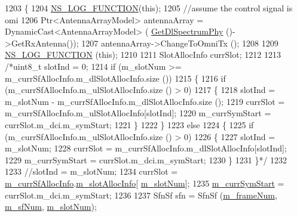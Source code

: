 \begin{DoxyCode}
1203 \{
1204 \hyperlink{log-macros-disabled_8h_a90b90d5bad1f39cb1b64923ea94c0761}{NS\_LOG\_FUNCTION}(\textcolor{keyword}{this});
1205         \textcolor{comment}{//assume the control signal is omi}
1206         Ptr<AntennaArrayModel> antennaArray = DynamicCast<AntennaArrayModel> (
      \hyperlink{classns3_1_1MmWaveEnbPhy_a1fd12ed3e1da54288cf17a1bb9bcdf74}{GetDlSpectrumPhy} ()->GetRxAntenna());
1207         antennaArray->ChangeToOmniTx ();
1208 
1209         \hyperlink{log-macros-disabled_8h_a90b90d5bad1f39cb1b64923ea94c0761}{NS\_LOG\_FUNCTION} (\textcolor{keyword}{this});
1210 
1211         SlotAllocInfo currSlot;
1212 
1213         \textcolor{comment}{/*uint8\_t slotInd = 0;}
1214 \textcolor{comment}{        if (m\_slotNum >= m\_currSfAllocInfo.m\_dlSlotAllocInfo.size ())}
1215 \textcolor{comment}{        \{}
1216 \textcolor{comment}{                if (m\_currSfAllocInfo.m\_ulSlotAllocInfo.size () > 0)}
1217 \textcolor{comment}{                \{}
1218 \textcolor{comment}{                        slotInd = m\_slotNum - m\_currSfAllocInfo.m\_dlSlotAllocInfo.size ();}
1219 \textcolor{comment}{                        currSlot = m\_currSfAllocInfo.m\_ulSlotAllocInfo[slotInd];}
1220 \textcolor{comment}{                        m\_currSymStart = currSlot.m\_dci.m\_symStart;}
1221 \textcolor{comment}{                \}}
1222 \textcolor{comment}{        \}}
1223 \textcolor{comment}{        else}
1224 \textcolor{comment}{        \{}
1225 \textcolor{comment}{                if (m\_currSfAllocInfo.m\_ulSlotAllocInfo.size () > 0)}
1226 \textcolor{comment}{                \{}
1227 \textcolor{comment}{                        slotInd = m\_slotNum;}
1228 \textcolor{comment}{                        currSlot = m\_currSfAllocInfo.m\_dlSlotAllocInfo[slotInd];}
1229 \textcolor{comment}{                        m\_currSymStart = currSlot.m\_dci.m\_symStart;}
1230 \textcolor{comment}{                \}}
1231 \textcolor{comment}{        \}*/}
1232 
1233         \textcolor{comment}{//slotInd = m\_slotNum;}
1234         currSlot = \hyperlink{classns3_1_1MmWavePhy_adf1e91c9da8a1d3f82b1517363cddbe8}{m\_currSfAllocInfo}.\hyperlink{structns3_1_1SfAllocInfo_a6a87109ff89bf270a74ff95a5bbf9231}{m\_slotAllocInfo}[
      \hyperlink{classns3_1_1MmWavePhy_a6c83cdb8c36a9a58ae8b9f17933680ac}{m\_slotNum}];
1235         \hyperlink{classns3_1_1MmWaveEnbPhy_acabeb79f3613d2a6f8fcd44732e1da1b}{m\_currSymStart} = currSlot.m\_dci.m\_symStart;
1236 
1237         SfnSf sfn = SfnSf (\hyperlink{classns3_1_1MmWavePhy_a852ce585035a1c12122d2775e64ff38a}{m\_frameNum}, \hyperlink{classns3_1_1MmWavePhy_af3d76eb9f3e5e1ff669852d05986c1a3}{m\_sfNum}, \hyperlink{classns3_1_1MmWavePhy_a6c83cdb8c36a9a58ae8b9f17933680ac}{m\_slotNum});

\end{DoxyCode}
